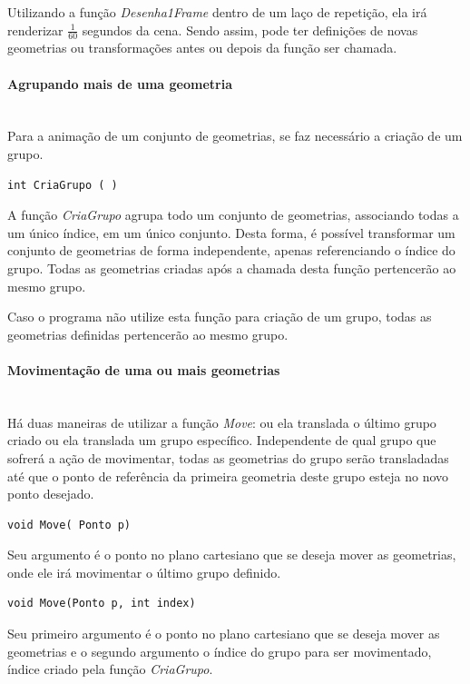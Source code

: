  Utilizando a função \emph{Desenha1Frame} dentro de um laço de repetição, ela irá renderizar $\frac{1}{60}$ segundos da cena. Sendo assim, pode ter definições de novas geometrias ou transformações antes ou depois da função ser chamada.

  \paragraph{Agrupando mais de uma geometria}\mbox{}\\

Para a animação de um conjunto de geometrias, se faz necessário a criação de um grupo.

\begin{lstlisting} 
int CriaGrupo ( )
\end{lstlisting}
A função \emph{CriaGrupo} agrupa todo um conjunto de geometrias, associando todas a um único índice, em um único conjunto. Desta forma, é possível transformar um conjunto de geometrias de forma independente, apenas referenciando o índice do grupo. Todas as geometrias criadas após a chamada desta função pertencerão ao mesmo grupo.

Caso o programa não utilize esta função para criação de um grupo, todas as geometrias definidas pertencerão ao mesmo grupo.

\paragraph{Movimentação de uma ou mais geometrias}\mbox{}\\
Há duas maneiras de utilizar a função \emph{Move}: ou ela translada o último grupo criado ou ela translada um grupo específico. Independente de qual grupo que sofrerá a ação de movimentar, todas as geometrias do grupo serão transladadas até que o ponto de referência da primeira geometria deste grupo esteja no novo ponto desejado.

\begin{lstlisting}
void Move( Ponto p)
\end{lstlisting}
Seu argumento é o ponto no plano cartesiano que se deseja mover as geometrias, onde ele irá movimentar o último grupo definido. 

\begin{lstlisting}
void Move(Ponto p, int index)
\end{lstlisting}
Seu primeiro argumento é o ponto no plano cartesiano que se deseja mover as geometrias e o segundo argumento o índice do grupo para ser movimentado, índice criado pela função \emph{CriaGrupo}. 

